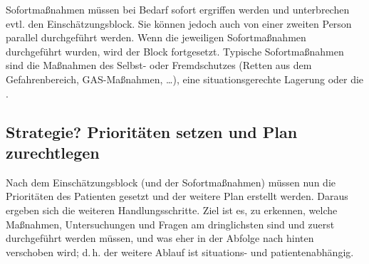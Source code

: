 Sofortmaßnahmen müssen bei Bedarf sofort ergriffen
werden und unterbrechen evtl. den Einschätzungsblock. Sie
können jedoch auch von einer zweiten Person parallel
durchgeführt werden. Wenn die jeweiligen Sofortmaßnahmen durchgeführt
wurden, wird der Block fortgesetzt. Typische Sofortmaßnahmen
sind die Maßnahmen des Selbst- oder Fremdschutzes (Retten
aus dem Gefahrenbereich, GAS-Maßnahmen, \ldots), eine
situationsgerechte Lagerung oder die \EE{\TxMassVit}.





\subsection{Strategie? Prioritäten setzen und Plan zurechtlegen}

Nach dem Einschätzungsblock (und der Sofortmaßnahmen) müssen
nun die Prioritäten des Patienten gesetzt und der weitere
Plan erstellt werden. Daraus ergeben sich die weiteren
Handlungsschritte. Ziel ist es, zu erkennen, welche
Maßnahmen, Untersuchungen und Fragen am dringlichsten sind
und zuerst durchgeführt werden müssen, und was eher in der
Abfolge nach hinten ver\-schoben wird; d.\,h. der weitere
Ablauf ist situations- und patientenabhängig.

